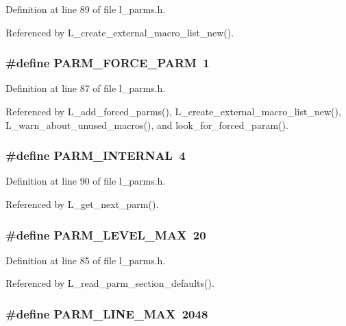 Definition at line 89 of file l\_\-parms.h.

Referenced by L\_\-create\_\-external\_\-macro\_\-list\_\-new().
\subsubsection{\setlength{\rightskip}{0pt plus 5cm}\#define PARM\_\-FORCE\_\-PARM~1}\label{l__parms_8h_67a42456590b7be2809d5118ed5acbf9}




Definition at line 87 of file l\_\-parms.h.

Referenced by L\_\-add\_\-forced\_\-parms(), L\_\-create\_\-external\_\-macro\_\-list\_\-new(), L\_\-warn\_\-about\_\-unused\_\-macros(), and look\_\-for\_\-forced\_\-param().
\subsubsection{\setlength{\rightskip}{0pt plus 5cm}\#define PARM\_\-INTERNAL~4}\label{l__parms_8h_42b3b86e57349beb5811eb1a0ee11b7f}




Definition at line 90 of file l\_\-parms.h.

Referenced by L\_\-get\_\-next\_\-parm().
\subsubsection{\setlength{\rightskip}{0pt plus 5cm}\#define PARM\_\-LEVEL\_\-MAX~20}\label{l__parms_8h_0524a320539156a7ce4de15c44565130}




Definition at line 85 of file l\_\-parms.h.

Referenced by L\_\-read\_\-parm\_\-section\_\-defaults().
\subsubsection{\setlength{\rightskip}{0pt plus 5cm}\#define PARM\_\-LINE\_\-MAX~2048}\label{l__parms_8h_a607c62ad2844f14adaaf6df59576b10}




